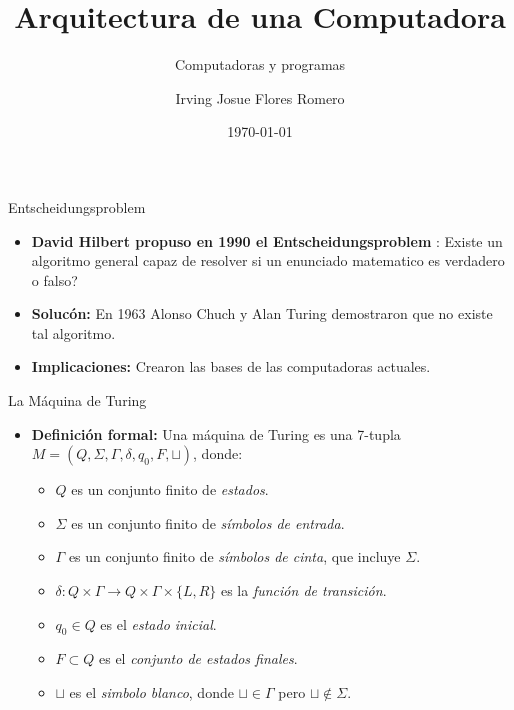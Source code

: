 \documentclass{beamer}
\title{Arquitectura de una Computadora}
\subtitle{Computadoras y programas}
\author{Irving Josue Flores Romero}
\date{\today}
\begin{document}
	
	\begin{frame}
		\titlepage
	\end{frame}
	
		\begin{frame}{Entscheidungsproblem}
		
		\begin{itemize}
			\item \textbf{David Hilbert propuso en 1990 el Entscheidungsproblem} : Existe un algoritmo general capaz de resolver si un enunciado matematico es verdadero o falso?
			\item \textbf{Solucón:} En 1963 Alonso Chuch y Alan Turing demostraron que no existe tal algoritmo.
			\item \textbf{Implicaciones:} Crearon las bases de las computadoras actuales.
		\end{itemize}
		
	\end{frame}
	
	\begin{frame}{La Máquina de Turing}
		
		\begin{itemize}
			\item \textbf{Definición formal:} 
			Una máquina de Turing es una 7-tupla $M = (Q, \Sigma, \Gamma, \delta, q_0, F, \sqcup)$, donde:
			
			\begin{itemize}
				\item $Q$ es un conjunto finito de \textit{estados}.
				\item $\Sigma$ es un conjunto finito de \textit{símbolos de entrada}.
				\item $\Gamma$ es un conjunto finito de \textit{símbolos de cinta}, que incluye $\Sigma$.
				\item $\delta : Q \times \Gamma \rightarrow Q \times \Gamma \times \{L, R\}$ es la \textit{función de transición}.
				\item $q_0 \in Q$ es el \textit{estado inicial}.
				\item $F \subset Q $ es el \textit{conjunto de estados finales}.
				\item $\sqcup$ es el \textit{simbolo blanco}, donde $\sqcup \in \Gamma$ pero  $\sqcup \notin \Sigma$.
			\end{itemize}
		\end{itemize}
		
	\end{frame}
	
\end{document}
